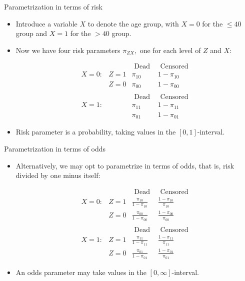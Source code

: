 \documentclass[10pt,handout]{beamer}\usepackage[]{graphicx}\usepackage[]{color}
\begin{document}
\begin{frame}{Parametrization in terms of risk}
	\begin{itemize}
		\item Introduce a variable $X$ to denote the age group, with $X=0$ for the $\leq 40$ group and $X=1$ for the $>40$ group.
		\item Now we have four risk parameters $\pi_{Z X},$ one for each level of $Z$ and $X:$
		
		$$
		\begin{array}{llcc} 
			     &      & \text { Dead } & \text { Censored } \\
			X=0: & Z=1 & \pi_{10} & 1-\pi_{10} \\
			     & Z=0 & \pi_{00} & 1-\pi_{00} \\
			        & & & \\
			     &  & \text { Dead } & \text { Censored } \\
			X=1:& & \pi_{11}      & 1-\pi_{11} \\
			 & & \pi_{01} & 1-\pi_{01}
		\end{array}
		$$
		\item Risk parameter is a probability, taking values in the $[0, 1]$-interval.
	\end{itemize}
\end{frame}



\begin{frame}{Parametrization in terms of odds}
	\begin{itemize}
		\item Alternatively, we may opt to parametrize in terms of odds,
		that is, risk divided by one minus itself:
		
				$$
		\begin{array}{llcc} 
		&      & \text { Dead } & \text { Censored } \\
		X=0: & Z=1 & \frac{\pi_{10}}{1-\pi_{10}} & \frac{1-\pi_{10}}{\pi_{10}} \\
		& Z=0 & \frac{\pi_{00}}{1- \pi_{00}} & \frac{1-\pi_{00}}{\pi_{00}} \\
		& & & \\
		&  & \text { Dead } & \text { Censored } \\
		X=1:&  Z=1 & \frac{\pi_{11}}{1-\pi_{11}}      & \frac{1-\pi_{11}}{\pi_{11}} \\
		    &  Z=0    & \frac{\pi_{01}}{1-\pi_{01}} & \frac{1-\pi_{01}}{\pi_{01}}
		\end{array}
		$$
		
		\item An odds parameter may take values in the $[0, \infty]$-interval.
	\end{itemize}
\end{frame}
\end{document}
